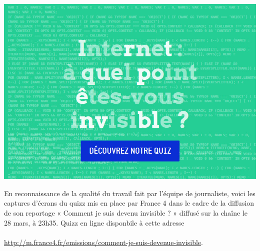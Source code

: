 \documentclass{beamer}
\begin{document}
\begin{frame}\includegraphics[scale=0.6] {./images/Quizz_HygieneNumerique_France4_1.jpg} \end{frame}

\begin{frame}
En reconnaissance de la qualité du travail fait par l'équipe de journaliste, voici les captures d'écrans du quizz mis en place par France 4 dans le cadre de la diffusion de son reportage « Comment je suis devenu invisible ? » diffusé sur la chaîne le 28 mars, à 23h35. Quizz en ligne disponbile à cette adresse \\~\\ \url{http://m.france4.fr/emissions/comment-je-suis-devenue-invisible}.

\end{frame}
\end{document}
